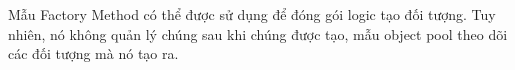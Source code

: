 Mẫu Factory Method có thể được sử dụng để đóng gói logic tạo đối tượng. Tuy nhiên, nó không quản lý chúng sau khi chúng được tạo, mẫu object pool theo dõi các đối tượng mà nó tạo ra.